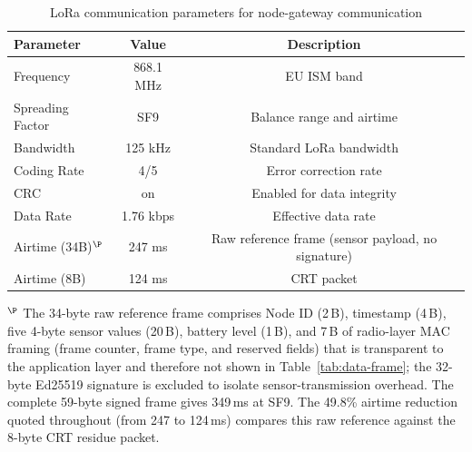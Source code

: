 \documentclass[pdflatex,sn-mathphys-num]{sn-jnl}
\theoremstyle{thmstyleone}
\theoremstyle{thmstyletwo}
\theoremstyle{thmstylethree}
\begin{document}
\begin{table}[htbp]
\centering
\caption{LoRa communication parameters for node-gateway communication}
\label{tab:lora-params}
\begin{tabular}{lcc}
\toprule
\textbf{Parameter} & \textbf{Value} & \textbf{Description} \\
\midrule
Frequency          & 868.1 MHz & EU ISM band \\
Spreading Factor   & SF9       & Balance range and airtime \\
Bandwidth          & 125 kHz   & Standard LoRa bandwidth \\
Coding Rate        & 4/5       & Error correction rate \\
CRC                & on        & Enabled for data integrity \\
Data Rate          & 1.76 kbps & Effective data rate \\
Airtime (34B)$^\P$ & 247 ms    & Raw reference frame (sensor payload, no signature) \\
Airtime (8B)       & 124 ms    & CRT packet \\
\bottomrule
\end{tabular}
{\footnotesize $^\P$ The 34-byte raw reference frame comprises Node ID (2\,B),
timestamp (4\,B), five 4-byte sensor values (20\,B), battery level (1\,B),
and 7\,B of radio-layer MAC framing (frame counter, frame type, and reserved fields)
that is transparent to the application layer and therefore not shown in Table~\ref{tab:data-frame};
the 32-byte Ed25519 signature is excluded to isolate sensor-transmission overhead.
The complete 59-byte signed frame gives 349\,ms at SF9. The 49.8\% airtime
reduction quoted throughout (from 247 to 124\,ms) compares this raw reference
against the 8-byte CRT residue packet.}
\end{table}
\end{document}
